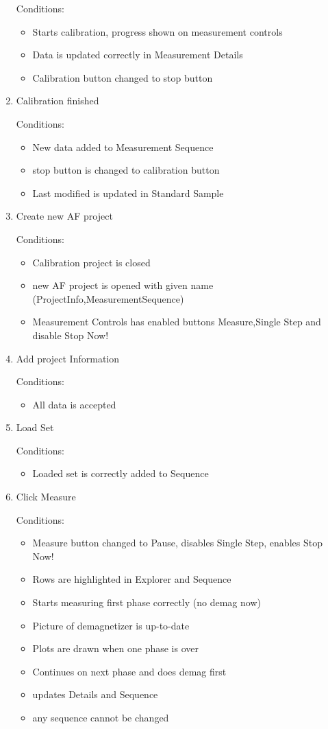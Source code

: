 \begin{enumerate}
Conditions:
\begin{itemize}
\item Starts calibration, progress shown on measurement controls
\item Data is updated correctly in Measurement Details
\item Calibration button changed to stop button
\end{itemize}

\item Calibration finished

Conditions:
\begin{itemize}
\item New data added to Measurement Sequence
\item stop button is changed to calibration button
\item Last modified is updated in Standard Sample
\end{itemize}

\item Create new AF project

Conditions:
\begin{itemize}
\item Calibration project is closed
\item new AF project is opened with given name (ProjectInfo,MeasurementSequence)
\item Measurement Controls has enabled buttons Measure,Single Step and disable Stop Now!
\end{itemize}

\item Add project Information

Conditions:
\begin{itemize}
\item All data is accepted
\end{itemize}

\item Load Set

Conditions:
\begin{itemize}
\item Loaded set is correctly added to Sequence
\end{itemize}

\item Click Measure

Conditions:
\begin{itemize}
\item Measure button changed to Pause, disables Single Step, enables Stop Now!
\item Rows are highlighted in Explorer and Sequence
\item Starts measuring first phase correctly (no demag now)
\item Picture of demagnetizer is up-to-date
\item Plots are drawn when one phase is over
\item Continues on next phase and does demag first
\item updates Details and Sequence
\item any sequence cannot be changed 
\end{itemize}


\end{enumerate}
